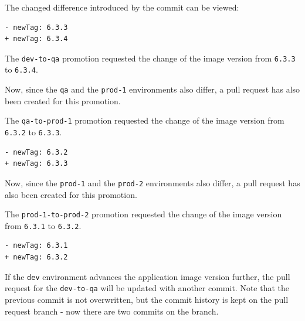 The changed difference introduced by the commit can be viewed:

\begin{lstlisting}
- newTag: 6.3.3
+ newTag: 6.3.4
\end{lstlisting}

The \lstinline|dev-to-qa| promotion requested the change of the image version from
\lstinline|6.3.3| to \lstinline|6.3.4|.

Now, since the \lstinline|qa| and the \lstinline|prod-1| environments
also differ,
a pull request has also been created for this promotion.


The \lstinline|qa-to-prod-1| promotion requested the change of the image version from
\lstinline|6.3.2| to \lstinline|6.3.3|.

\begin{lstlisting}
- newTag: 6.3.2
+ newTag: 6.3.3
\end{lstlisting}

Now, since the \lstinline|prod-1| and the \lstinline|prod-2| environments
also differ,
a pull request has also been created for this promotion.


The \lstinline|prod-1-to-prod-2| promotion requested the change of the image version from
\lstinline|6.3.1| to \lstinline|6.3.2|.

\begin{lstlisting}
- newTag: 6.3.1
+ newTag: 6.3.2
\end{lstlisting}

If the \lstinline|dev| environment advances the application image version further,
the pull request for the \lstinline|dev-to-qa| will be updated with another commit.
Note that the previous commit is not overwritten, 
but the commit history is kept on the pull request branch - now there are two commits on the branch.

